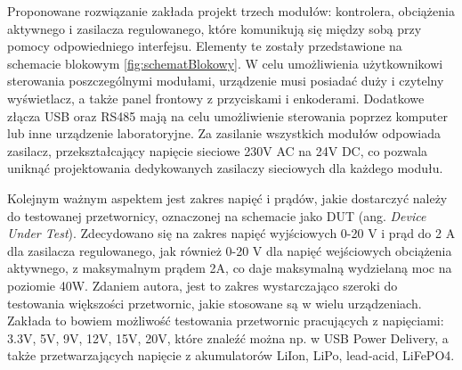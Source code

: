 Proponowane rozwiązanie zakłada projekt trzech modułów: kontrolera, obciążenia aktywnego i zasilacza regulowanego, 
które komunikują się między sobą przy pomocy odpowiedniego interfejsu.
Elementy te zostały przedstawione na schemacie blokowym \ref{fig:schematBlokowy}.
W celu umożliwienia użytkownikowi sterowania poszczególnymi modułami, urządzenie musi posiadać duży i czytelny wyświetlacz, a także panel frontowy z przyciskami i enkoderami.
Dodatkowe złącza USB oraz RS485 mają na celu umożliwienie sterowania poprzez komputer lub inne urządzenie laboratoryjne.
Za zasilanie wszystkich modułów odpowiada zasilacz, przekształcający napięcie sieciowe 230V AC na 24V DC, co pozwala uniknąć projektowania dedykowanych zasilaczy sieciowych dla każdego modułu.

Kolejnym ważnym aspektem jest zakres napięć i prądów, jakie dostarczyć należy do testowanej przetwornicy, oznaczonej na schemacie jako DUT
 (ang. \textit{Device Under Test}).
Zdecydowano się na zakres napięć wyjściowych 0-20 V i prąd do 2 A dla zasilacza regulowanego, jak również 0-20 V dla napięć wejściowych obciążenia aktywnego, z maksymalnym prądem 2A, co daje maksymalną wydzielaną moc na poziomie 40W.
Zdaniem autora, jest to zakres wystarczająco szeroki do testowania większości przetwornic, jakie stosowane są w wielu urządzeniach.
Zakłada to bowiem możliwość testowania przetwornic pracujących z napięciami: 3.3V, 5V, 9V, 12V, 15V, 20V, które znaleźć można np. w USB Power Delivery, a także
przetwarzających napięcie z akumulatorów LiIon, LiPo, lead-acid, LiFePO4.

